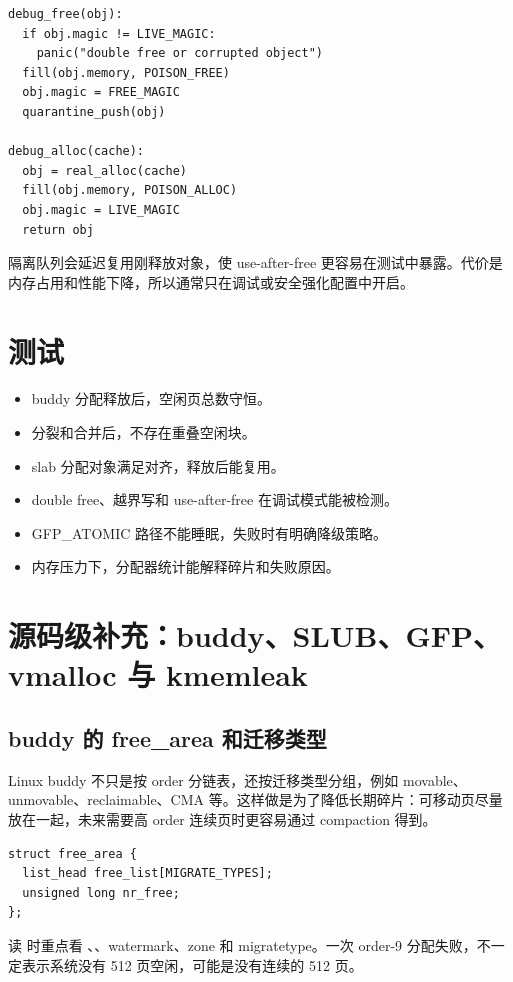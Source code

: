 \begin{lstlisting}
debug_free(obj):
  if obj.magic != LIVE_MAGIC:
    panic("double free or corrupted object")
  fill(obj.memory, POISON_FREE)
  obj.magic = FREE_MAGIC
  quarantine_push(obj)

debug_alloc(cache):
  obj = real_alloc(cache)
  fill(obj.memory, POISON_ALLOC)
  obj.magic = LIVE_MAGIC
  return obj
\end{lstlisting}

隔离队列会延迟复用刚释放对象，使 use-after-free 更容易在测试中暴露。代价是内存占用和性能下降，所以通常只在调试或安全强化配置中开启。

\section{测试}

\begin{itemize}
\tightlist
\item buddy 分配释放后，空闲页总数守恒。
\item 分裂和合并后，不存在重叠空闲块。
\item slab 分配对象满足对齐，释放后能复用。
\item double free、越界写和 use-after-free 在调试模式能被检测。
\item GFP\_ATOMIC 路径不能睡眠，失败时有明确降级策略。
\item 内存压力下，分配器统计能解释碎片和失败原因。
\end{itemize}

\section{源码级补充：buddy、SLUB、GFP、vmalloc 与 kmemleak}

\subsection{buddy 的 free\_area 和迁移类型}

Linux buddy 不只是按 order 分链表，还按迁移类型分组，例如 movable、unmovable、reclaimable、CMA 等。这样做是为了降低长期碎片：可移动页尽量放在一起，未来需要高 order 连续页时更容易通过 compaction 得到。

\begin{lstlisting}
struct free_area {
  list_head free_list[MIGRATE_TYPES];
  unsigned long nr_free;
};
\end{lstlisting}

读  时重点看 、、watermark、zone 和 migratetype。一次 order-9 分配失败，不一定表示系统没有 512 页空闲，可能是没有连续的 512 页。

